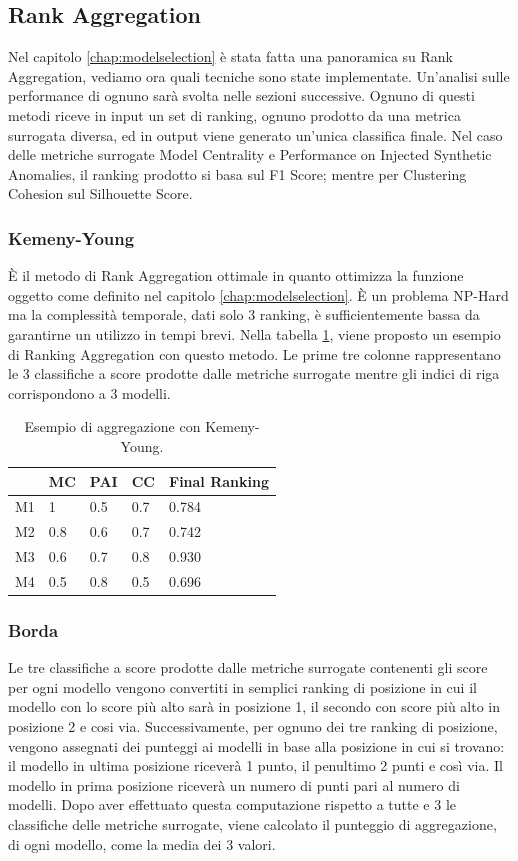 \subsection{Rank Aggregation}
Nel capitolo \ref{chap:modelselection} è stata fatta una panoramica su Rank Aggregation, vediamo ora quali tecniche sono state implementate. Un'analisi sulle performance di ognuno sarà svolta nelle sezioni successive.
Ognuno di questi metodi riceve in input un set di ranking, ognuno prodotto da una metrica surrogata diversa, ed in output viene generato un'unica classifica finale.
Nel caso delle metriche surrogate Model Centrality e Performance on Injected Synthetic Anomalies, il ranking prodotto si basa sul F1 Score; mentre per Clustering Cohesion sul Silhouette Score.
\subsubsection{Kemeny-Young}
È il metodo di Rank Aggregation ottimale in quanto ottimizza la funzione oggetto come definito nel capitolo \ref{chap:modelselection}. È un problema NP-Hard ma la complessità temporale, dati solo 3 ranking, è sufficientemente bassa da garantirne un utilizzo in tempi brevi. Nella tabella \ref{kemeny-young}, viene proposto un esempio di Ranking Aggregation con questo metodo. Le prime tre colonne rappresentano le 3 classifiche a score prodotte dalle metriche surrogate mentre gli indici di riga corrispondono a 3 modelli.
\begin{table}
	\centering
	\caption{\label{kemeny-young}Esempio di aggregazione con Kemeny-Young.}
	\begin{tabular}{|l|l|l|l|l|} 
		\hline
		   & MC  & PAI & CC  & Final Ranking \\ 
		\hline
		M1 & 1   & 0.5 & 0.7 & 0.784         \\ 
		\hline
		M2 & 0.8 & 0.6 & 0.7 & 0.742         \\ 
		\hline
		M3 & 0.6 & 0.7 & 0.8 & 0.930         \\ 
		\hline
		M4 & 0.5 & 0.8 & 0.5 & 0.696         \\
		\hline
	\end{tabular}
\end{table}

\subsubsection{Borda}
Le tre classifiche a score prodotte dalle metriche surrogate contenenti gli score per ogni modello vengono convertiti in semplici ranking di posizione in cui il modello con lo score più alto sarà in posizione 1, il secondo con score più alto in posizione 2 e cosi via. 
Successivamente, per ognuno dei tre ranking di posizione, vengono assegnati dei punteggi ai modelli in base alla posizione in cui si trovano: il modello in ultima posizione riceverà 1 punto, il penultimo 2 punti e così via. Il modello in prima posizione riceverà un numero di punti pari al numero di modelli. 
Dopo aver effettuato questa computazione rispetto a tutte e 3 le classifiche delle metriche surrogate, viene calcolato il punteggio di aggregazione, di ogni modello, come la media dei 3 valori.

